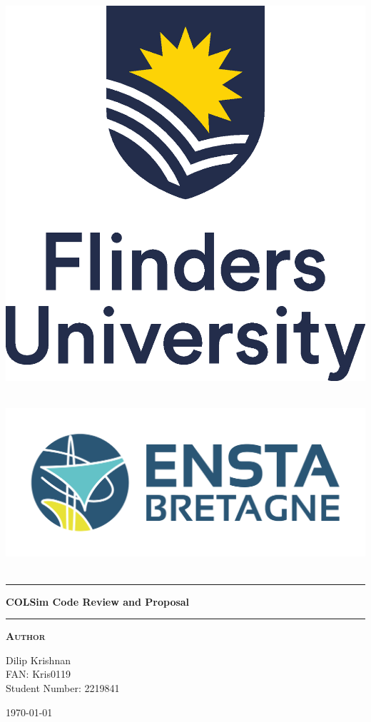 
\begin{titlepage}
\begin{center}
\vspace{1cm}
\begin{minipage}[c]{0.6\linewidth}
    \centering
    \includegraphics[width=0.6\linewidth]{root/Flinders_University_Logo_Stacked_RGB_Master.eps}~\\[1cm]
\end{minipage}\vspace{0.5cm}
\begin{minipage}[c]{0.6\linewidth}
    \centering
    \includegraphics[width=0.9\linewidth]{root/ENSTA-LogoH-COULEUR.png}~\\[1cm]
\end{minipage}
\vspace{1cm}

\hrule
\vspace{.5cm}
{ \huge \bfseries COLSim Code Review and Proposal} %
\vspace{.5cm}

\hrule
\vspace{1.5cm}

\textsc{\textbf{Author}}\\
\vspace{.5cm}
\centering

Dilip Krishnan\\
FAN: Kris0119\\
Student Number: 2219841\\


\vspace{4cm}

\centering \today %
\end{center}
\end{titlepage}